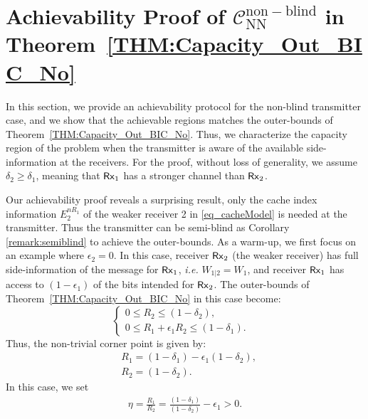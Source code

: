 \documentclass[journal,12pt,draftcls,onecolumn]{IEEEtran}
\begin{document}



\section{Achievability Proof of $\mathcal{C}^\mathrm{non-blind}_\mathrm{NN}$ in Theorem~\ref{THM:Capacity_Out_BIC_No}}
\label{Section:Achievability_NonBlind}


In this section, we provide an achievability protocol for the non-blind transmitter case, and we show that the achievable regions matches the outer-bounds of Theorem~\ref{THM:Capacity_Out_BIC_No}. Thus, we characterize the capacity region of the problem when the transmitter is aware of the available side-information at the receivers. For the proof, without loss of generality, we assume $\delta_2 \geq \delta_1$, meaning that ${\sf Rx}_1$ has a stronger channel than ${\sf Rx}_2$.

Our achievability proof reveals a surprising result, only the cache index information $E^{nR_1}_2$ of the weaker receiver 2 in \eqref{eq_cacheModel} is needed at the transmitter. Thus the transmitter can be semi-blind as Corollary \ref{remark:semiblind} to achieve the outer-bounds. As a warm-up, we first focus on an example where $\epsilon_2 = 0$. In this case, receiver ${\sf Rx}_2$ (the weaker receiver) has full side-information of the message for ${\sf Rx}_1$, \emph{i.e.} $W_{1|2} = W_1$, and receiver ${\sf Rx}_1$ has access to $(1-\epsilon_1)$ of the bits intended for ${\sf Rx}_2$. The outer-bounds of Theorem~\ref{THM:Capacity_Out_BIC_No} in this case become:
\begin{equation}
\label{Eq:FullSideInfo_Weaker}
\left\{ \begin{array}{ll}
0 \leq R_2 \leq \left( 1 - \delta_2 \right), & \\
0 \leq R_1 + \epsilon_1 R_2 \leq \left( 1 - \delta_1 \right).
\end{array} \right.
\end{equation}
Thus, the non-trivial corner point is given by:
\begin{align}
\label{Eq:FullSideInfo_Weaker_Rates}
&R_1 = (1-\delta_1) - \epsilon_1 (1-\delta_2), \nonumber \\
&R_2 = (1-\delta_2).
\end{align}
In this case, we set
\begin{align}
\eta = \frac{R_1}{R_2} = \frac{(1-\delta_1)}{(1-\delta_2)} - \epsilon_1 > 0.
\end{align}
\end{document}
